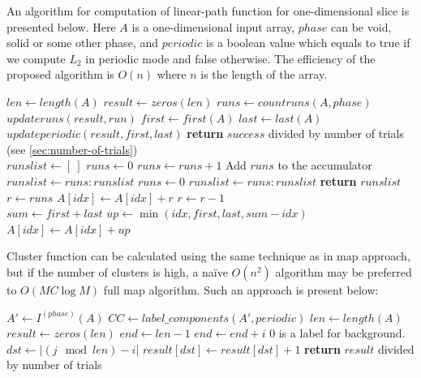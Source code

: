 \documentclass[1p]{elsarticle}
\begin{document}
An algorithm for computation of linear-path function for one-dimensional slice
is presented below. Here $A$ is a one-dimensional input array, $phase$ can be
void, solid or some other phase, and $periodic$ is a boolean value which equals
to true if we compute $L_2$ in periodic mode and false otherwise. The efficiency
of the proposed algorithm is $O(n)$ where $n$ is the length of the array.
\begin{algorithmic}[1]
    \State $len \gets length(A)$
    \State $result \gets zeros(len)$
    \State $runs \gets countruns(A, phase)$
      \State $updateruns(result, run)$
    \EndFor
      \State $first \gets first(A)$
      \State $last \gets last(A)$
        \State $updateperiodic(result, first, last)$
      \EndIf
    \EndIf
    \State \textbf{return} $success$ divided by number of trials
    (see \ref{sec:number-of-trials})
  \EndProcedure
  \\
    \State $runslist \gets [\ ]$
    \State $runs \gets 0$
        \State $runs \gets runs + 1$
        \Comment Add $runs$ to the accumulator
        \State $runslist \gets runs:runslist$
        \State $runs \gets 0$
      \EndIf
    \EndFor
      \State $runslist \gets runs:runslist$
    \EndIf
    \State \textbf{return} $runslist$
  \EndProcedure
  \\
    \State $r \gets runs$
      \State $A[idx] \gets A[idx] + r$
      \State $r \gets r - 1$
    \EndFor
  \EndProcedure
  \\
    \State $sum \gets first + last$
      \State $up \gets \min(idx, first, last, sum - idx)$
      \State $A[idx] \gets A[idx] + up$
    \EndFor
  \EndProcedure
\end{algorithmic}

Cluster function can be calculated using the same technique as in map approach,
but if the number of clusters is high, a naïve $O(n^2)$ algorithm may be
preferred to $O(MC \log M)$ full map algorithm. Such an approach is present below:
\begin{algorithmic}[1]
    \State $A' \gets I^{(phase)}(A)$
    \State $CC \gets label\_components(A', periodic)$
    \State $len \gets length(A)$
    \State $result \gets zeros(len)$
        \State $end \gets len-1$
          \State $end \gets end + i$
        \EndIf
            \Comment $0$ is a label for background.
            \State $dst \gets |(j \mod len) - i|$
            \State $result[dst] \gets result[dst] + 1$
          \EndIf
        \EndFor
      \EndFor
    \EndFor
    \State \textbf{return} $result$ divided by number of trials
  \EndProcedure
\end{algorithmic}
\end{document}
